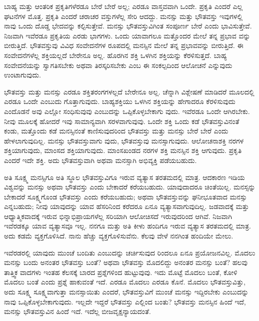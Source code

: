 ಬಾಹ್ಯ ಮತ್ತು ಆಂತರಿಕ ಪ್ರಕೃತಿಗಳೆರಡೂ ಬೇರೆ ಬೇರೆ ಅಲ್ಲ; ಎರಡೂ ವಾಸ್ತವವಾಗಿ ಒಂದೇ. ಪ್ರಕೃತಿ ಎಂದರೆ ಎಲ್ಲ ಘಟನೆಗಳ ಮೊತ್ತ. ಪ್ರಕೃತಿ ಎಂದರೆ ಚರಾಚರ ವಸ್ತುಗಳೆಲ್ಲ ಸೇರಿ ಆದದ್ದು. ಮನಸ್ಸು ಮತ್ತು ಭೌತವಸ್ತು ಇವುಗಳಲ್ಲಿ ನಾವು ಒಂದು ದೊಡ್ಡ ಭೇದವನ್ನು ಕಲ್ಪಿಸುತ್ತೇವೆ. ಮನಸ್ಸು ಭೌತವಸ್ತುವಿಗಿಂತ ಸಂಪೂರ್ಣ ಬೇರೆ ಎಂದು ಭಾವಿಸುತ್ತೇವೆ. ನಿಜವಾಗಿ ಇವೆರಡೂ ಪ್ರಕೃತಿಯ ಎರಡು ಭಾಗಗಳು. ಒಂದು ಯಾವಾಗಲೂ ಮತ್ತೊಂದರ ಮೇಲೆ ತನ್ನ ಪ್ರಭಾವ ವನ್ನು ಬೀರುತ್ತಿದೆ. ಭೌತವಸ್ತುವು ವಿವಿಧ ಸಂವೇದನೆಗಳ ರೂಪದಲ್ಲಿ ಮನಸ್ಸಿನ ಮೇಲೆ ತನ್ನ ಪ್ರಭಾವವನ್ನು ಬೀರುತ್ತಿದೆ. ಈ ಸಂವೇದನೆಗಳೆಲ್ಲ  ಶಕ್ತಿಯಲ್ಲದೆ ಬೇರೇನೂ ಅಲ್ಲ. ಹೊರಗಿನ ಶಕ್ತಿ ಒಳಗಿನ ಶಕ್ತಿಯನ್ನು ಕೆರಳಿಸುತ್ತದೆ. ಬಾಹ್ಯ ಸಂವೇದನೆಯನ್ನು ಸ್ವಾಗತಿಸಬೇಕು ಅಥವಾ ತಿರಸ್ಕರಿಸಬೇಕು ಎಂಬ ಈ ಸಂಕಲ್ಪದಿಂದ ಆಲೋಚನೆ ಎನ್ನುವುದು ಉಂಟಾಗುವುದು.

ಭೌತವಸ್ತು ಮತ್ತು ಮನಸ್ಸು ಎರಡೂ ಶಕ್ತಿತರಂಗಗಳಲ್ಲದೆ ಬೇರೇನೂ ಅಲ್ಲ. ಚೆನ್ನಾಗಿ ವಿಶ್ಲೇಷಣೆ ಮಾಡಿದರೆ ಮೂಲದಲ್ಲಿ ಎರಡೂ ಒಂದೇ ಎಂಬುದು ಗೊತ್ತಾಗುವುದು. ಬಾಹ್ಯಶಕ್ತಿಯು ಒಳಗಿನ ಶಕ್ತಿಯನ್ನು ಹೇಗಾದರೂ ಕೆರಳಿಸುವುದು ಎಂದೊಡನೆ ಅವು ಎಲ್ಲೋ ಸಂಧಿಸುವುವು ಎಂಬುದನ್ನು ಒಪ್ಪಿಕೊಳ್ಳಬೇಕಾಗು ವುದು. ಇವೆರಡೂ ಒಂದೇ ಆಗಿರಬೇಕು. ನೀವು ಮೂಲಕ್ಕೆ ಹೋದರೆ ಇವು ಸಾಮಾನ್ಯವಾಗಿ ಸರಳವಾಗುವುವು. ಒಂದೇ ಶಕ್ತಿ ಒಂದು ಕಡೆ ಭೌತವಸ್ತುವಿನಂತೆ ಕಂಡು, ಮತ್ತೊಂದು ಕಡೆ ಮನಸ್ಸಿನಂತೆ ಕಾಣಿಸುವುದರಿಂದ ಭೌತವಸ್ತು ಮತ್ತು ಮನಸ್ಸು ಬೇರೆ ಬೇರೆ ಎಂದು ಹೇಳಲಾಗುವುದಿಲ್ಲ. ಮನಸ್ಸು ಭೌತವಸ್ತುವಾಗು ವುದು, ಭೌತವಸ್ತುವು ಮನಸ್ಸಾಗುವುದು. ಆಲೋಚನಾಶಕ್ತಿ ನರಗಳ ಶಕ್ತಿಯಾಗುವುದು, ಮಾಂಸದ ಶಕ್ತಿಯಾಗುವುದು. ಮಾಂಸಖಂಡದ ನರಗಳ ಶಕ್ತಿ ಮನಸ್ಸಿನ ಶಕ್ತಿ ಆಗುವುದು. ಪ್ರಕೃತಿ ಎಂದರೆ ಇದೇ ಶಕ್ತಿ. ಅದು ಭೌತವಸ್ತುವಾಗಿ ಅಥವಾ ಮನಸ್ಸಾಗಿ ಅಭಿವ್ಯಕ್ತಿ ಪಡೆಯಬಹುದು.

ಅತಿ ಸೂಕ್ಷ್ಮ ಮನಸ್ಸಿಗೂ ಅತಿ ಸ್ಥೂಲ ಭೌತವಸ್ತುವಿಗೂ ಇರುವ ವ್ಯತ್ಯಾಸ ತರತಮದಲ್ಲಿ ಮಾತ್ರ. ಆದಕಾರಣ ಇಡಿಯ ವಿಶ್ವವನ್ನು ಮನಸ್ಸು ಅಥವಾ ಭೌತವಸ್ತು ಎಂದು ಬೇಕಾದರೆ ಕರೆಯಬಹುದು. ಯಾವುದಾದರೂ ಚಿಂತೆಯಿಲ್ಲ. ಮನಸ್ಸನ್ನು ಬೇಕಾದರೆ ಸೂಕ್ಷ್ಮಗೊಂಡ ಭೌತವಸ್ತು ಎಂದು ಕರೆಯಬಹುದು; ಅಥವಾ ಭೌತವಸ್ತುವನ್ನು ಘನೀಭೂತವಾದ ಮನಸ್ಸು ಎನ್ನಬಹುದು; ನೀವು ಯಾವುದನ್ನು ಯಾವ ಹೆಸರಿನಿಂದ ಕರೆದರೂ ಏನೂ ವ್ಯತ್ಯಾಸವಾಗುವುದಿಲ್ಲ. ಜಡವಾದಕ್ಕೆ ಮತ್ತು ಆಧ್ಯಾತ್ಮಿಕವಾದಕ್ಕೆ ಇರುವ ಭಿನ್ನಾಭಿಪ್ರಾಯಗಳೆಲ್ಲ ಸರಿಯಾಗಿ ಆಲೋಚಿಸದೆ ಇರುವುದರಿಂದ ಆಗಿವೆ. ನಿಜವಾಗಿ ಇವೆರಡಕ್ಕೂ ಯಾವ ವ್ಯತ್ಯಾಸವೂ ಇಲ್ಲ. ನನಗೂ ಮತ್ತು ಅತಿ ಕೀಳು ಹಂದಿಗೂ ಇರುವ ವ್ಯತ್ಯಾಸ ತರತಮದಲ್ಲಿ ಮಾತ್ರ. ಅದು ಕಡಮೆ ವ್ಯಕ್ತಗೊಳಿಸಿದೆ. ನಾನು ಹೆಚ್ಚು ವ್ಯಕ್ತಗೊಳಿಸುವೆನು. ಕೆಲವು ವೇಳೆ ನನಗಿಂತ ಹಂದಿಯೇ ಮೇಲು.

ಇವೆರಡರಲ್ಲಿ ಯಾವುದು ಮುಂಚೆ ಬಂದಿತು ಎಂಬುದನ್ನು ಚರ್ಚಿಸುವುದ ರಿಂದಲೂ ಏನೂ ಪ್ರಯೋಜನವಿಲ್ಲ. ಮೊದಲು ಮನಸ್ಸು ಬಂದು ಅನಂತರ ಭೌತವಸ್ತು ಬಂತೆ? ಅಥವಾ ಭೌತವಸ್ತು ಮೊದಲಿದ್ದು ಅನಂತರ ಮನಸ್ಸು ಬಂತೆ? ಹಲವು ತಾತ್ತ್ವಿಕ ವಾದಗಳು ಇಂತಹ ಕೆಲಸಕ್ಕೆ ಬಾರದ ಪ್ರಶ್ನೆಗಳಿಂದ ಹುಟ್ಟುವುವು. ಇದು ಮೊಟ್ಟೆ ಮೊದಲು ಬಂತೆ, ಕೋಳಿ ಮೊದಲು ಬಂತೆ ಎಂದು ಪ್ರಶ್ನೆ ಹಾಕುವಂತೆ ಇದೆ. ಎರಡೂ ಮೊದಲು ಎರಡೂ ಕೊನೆ. ಮೊದಲು ಭೌತವಸ್ತುವಿತ್ತು, ಅದು ಸೂಕ್ಷ್ಮ ಸೂಕ್ಷ್ಮವಾಗುತ್ತಾ ಮನಸ್ಸಾಯಿತು ಎಂದರೆ, ಭೌತವಸ್ತುವಿಗೆ ಮುಂಚೆ ಮನಸ್ಸು ಇದ್ದಿರಬೇಕು ಎಂಬುದನ್ನು ನಾವು ಒಪ್ಪಿಕೊಳ್ಳಬೇಕಾಗುವುದು. ಇಲ್ಲದೇ ಇದ್ದರೆ ಭೌತವಸ್ತು ಎಲ್ಲಿಂದ ಬಂತು? ಭೌತವಸ್ತು ಮನಸ್ಸಿನ ಹಿಂದೆ ಇದೆ, ಮನಸ್ಸು ಭೌತವಸ್ತುವಿನ ಹಿಂದೆ ಇದೆ. ಇದೆಲ್ಲ ಬೀಜವೃಕ್ಷನ್ಯಾಯದಂತೆ.

